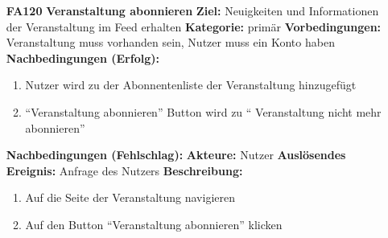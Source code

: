 \documentclass[parskip=full]{scrartcl}
\begin{document}
\begin{itemize}[nosep]
			\item[\textbf{FA120}]\textbf{Veranstaltung abonnieren}
			\newline \textbf{Ziel:} Neuigkeiten und Informationen der Veranstaltung im \gls{Feed} erhalten
			\newline \textbf{Kategorie:} primär
			\newline \textbf{Vorbedingungen:} Veranstaltung muss vorhanden sein, Nutzer muss ein Konto haben
			\newline \textbf{Nachbedingungen (Erfolg):} 
			\begin{enumerate}[nosep]
				\item Nutzer wird zu der Abonnentenliste der Veranstaltung hinzugefügt
				\item “Veranstaltung abonnieren” Button wird zu “ Veranstaltung nicht mehr abonnieren” 
			\end{enumerate}
			\textbf{Nachbedingungen (Fehlschlag):}
			\newline \textbf{Akteure:} Nutzer
			\newline \textbf{Auslösendes Ereignis:} Anfrage des Nutzers
			\newline \textbf{Beschreibung:}
			\begin{enumerate}[nosep]
				\item Auf die Seite der Veranstaltung navigieren
				\item Auf den Button “Veranstaltung abonnieren” klicken\\
			\end{enumerate}
						

\end{itemize}
\end{document}
